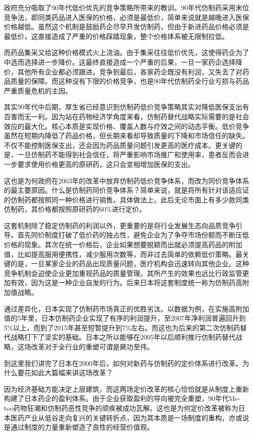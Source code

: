 政府充分吸取了90年代低价优先的竞争策略所带来的教训。90年代仿制药采用末位竞争法，即同类药品进入医保的价格，必须是最低价，简单来说就是越晚进入医保价格越低。虽然这个机制是鼓励药企尽早开发仿制药，但由于新进药品价格必须是最低价，这直接造成了严重的价格踩踏现象，整个价格体系被无限制拉低。

而药品集采又给这种价格模式火上浇油。由于集采往往低价优先，这使得药企为了中选而选择进一步降价。这最终直接造成一个严重的后果，一旦一家药企选择降价，其他所有企业都必须跟进。竞争到最后，各家药企既没有利润，又失去了对药品质量的保障。而这种没有下限的价格竞争，也是90年代仿制药全行业亏损与药品严重质量危机的主因。

其实90年代中后期，厚生省已经意识到仿制药低价竞争策略其实对降低医保支出有百害而无一利。因为站在药物经济学角度来看，仿制药替代战略实际需要的是社会效应的最大化。核心本质是实现价格、覆盖人数与疗效之间的动态平衡。低价竞争虽然在短期内降低了药品价格，但长期来看却导致质量的下降和市场信任的缺失。不仅不能控制医保支出，还会因为药品质量问题引发更高的医疗成本。更关键的是，一旦仿制药不能得到社会信任，将严重影响市场推广和使用率，患者反而会进一步要求使用价格更高的原研药，这只会变相增加医保的支出。

这也是为何政府在2003年的改革中放弃仿制药低价竞争体系，而改为同价竞争体系的最主要原因。什么是仿制药同价竞争体系？简单来说，就是将所有针对该适应证的仿制药都按照同一种价格进行销售。具体做法上，此后无论市面上有多少款同类仿制药，其价格都按照原研药的60\%进行定价。

这套机制除了稳定仿制药的利润以外，更重要的是将行业发展生态向品质竞争引导。首先同价制度打破了低价药的独占性，避免企业为了争夺市场份额而不断压低价格的现象。其次在统一价格后，企业如果想要脱颖而出就必须提高药品的附加值，比如提高服用便携性，减少服用次数等，而非过去简单的依赖低价策略。最关键的是，一旦某家企业的药品出现质量问题，医疗机构会迅速转向其他企业。这种竞争机制会迫使企业更加重视药品的质量管理。其所产生的效果也远比行政监管更加有效，因为这是一种企业自发的行为。后来日本将这套制度统一称为仿制药高附加值战略。

通过差异化，日本实现了仿制药市场真正的优胜劣汰。以数据为例，在实施高附加值的5年里，日本仿制药企业实现了有序的利润提升，至2007年净利润普遍回升到5\%以上，而到了2015年甚至短暂提升到7\%左右。而这也为后来的第二次仿制药替代战略打下了坚实的基础。日本之所以能够在2005年以后顺利推行仿制药替代战略，这场改革对于全行业的重塑可谓是厥功至伟。

到这里我们讲完了日本在2000年后，如何对新药与仿制药的定价体系进行改革。为什么要花如此大篇幅来讲这场改革？

因为经济基础方能决定上层建筑，而这两场定价改革的核心恰恰就是从制度上重新构建了日本药企的盈利体系。由于企业获取盈利的导向被完全重塑，90年代Me-too药物狂潮和仿制药恶性竞争的顽疾被成功瓦解。这也是为何定价改革被称为日本医药产业从低谷走向复兴的关键转折点，因为其本质是一场制度的重构，亦或说是通过制度的力量重新塑造了良性的经营价值观。

